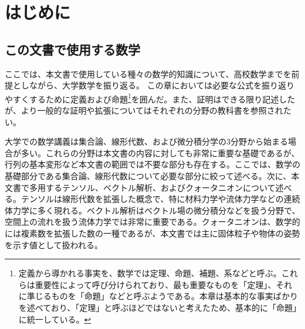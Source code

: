 \chapter{はじめに}
\section{この文書で使用する数学}\label{sec:math_prepare}
ここでは、本文書で使用している種々の数学的知識について、高校数学までを前提としながら、大学数学を振り返る。
この章においては必要な公式を振り返りやすくするために定義および命題\footnote{定義から導かれる事実を、数学では定理、命題、補題、系などと呼ぶ。これらは重要性によって呼び分けられており、最も重要なものを「定理」、それに準じるものを「命題」などと呼ぶようである。本章は基本的な事実ばかりを述べており、「定理」と呼ぶほどではないと考えたため、基本的に「命題」に統一している。}を囲んだ。また、証明はできる限り記述したが、より一般的な証明や拡張についてはそれぞれの分野の教科書を参照されたい。

大学での数学講義は集合論、線形代数、および微分積分学の3分野から始まる場合が多い。これらの分野は本文書の内容に対しても非常に重要な基礎であるが、行列の基本変形など本文書の範囲では不要な部分も存在する。ここでは、数学の基礎部分である集合論、線形代数について必要な部分に絞って述べる。次に、本文書で多用するテンソル、ベクトル解析、およびクォータニオンについて述べる。テンソルは線形代数を拡張した概念で、特に材料力学や流体力学などの連続体力学に多く現れる。ベクトル解析はベクトル場の微分積分などを扱う分野で、空間上の流れを扱う流体力学では非常に重要である。クォータニオンは、数学的には複素数を拡張した数の一種であるが、本文書では主に固体粒子や物体の姿勢を示す値として扱われる。

